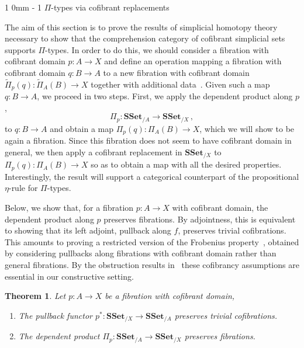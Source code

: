 \documentclass[reqno,10pt,a4paper,oneside]{amsart}
\makeatletter
\renewcommand{\section}{\@startsection
{section}%
{1}%
{0mm}%
{-\baselineskip}%
{1\baselineskip}%
{\Large \bfseries}}%
\numberwithin{equation}{section}
\theoremstyle{mythm}
\newtheorem{theorem}{Theorem}[section]
\theoremstyle{mydef}
\theoremstyle{myrmk}
\newcommand{\ie}{\text{i.e.\ }}
\newcommand{\co}{\colon}
\newcommand{\SSet}{\mathbf{SSet}}
\makeatother
\begin{document}
\section{$\Pi$-types via cofibrant replacements}
\label{sec:Pi-types}

The aim of this section is to prove the results of simplicial homotopy theory necessary to show that
the comprehension category of cofibrant simplicial sets supports $\Pi$-types. 
In order to do this, we should consider a fibration with cofibrant domain $p \co A \to X$  and define an operation mapping a fibration with cofibrant domain $q \co B \to A$  to a new fibration with cofibrant domain~$\widetilde{\Pi}_p(q) \co \widetilde{\Pi}_A(B) \to X$ together with additional data~\cite{LumsdaineP:locuoc}. 
Given such a map $q \co B \to A$, we proceed
in two steps. First, we apply the dependent product along $p$, 
\[
\Pi_p \co \SSet_{/A} \to \SSet_{/X} \, , 
\]
to $q \co B \to A$ and obtain a map $\Pi_p(q) \co \Pi_A(B) \to X$, which we will show to be again a fibration. Since this fibration does not seem to have  cofibrant domain in general, we then apply a
cofibrant replacement in $\SSet_{/X}$ to $\Pi_p(q) \co \Pi_A(B) \to X$ so as to obtain a map with all the desired properties. Interestingly, the result will support a categorical counterpart of the propositional
$\eta$-rule for $\Pi$-types.

Below, we show that, for a fibration $p \co A \rightarrow X$ with cofibrant domain, the dependent product along $p$ preserves fibrations. By adjointness, this is equivalent to showing that its left adjoint, \ie 
 pullback along $f$, preserves trivial cofibrations. This amounts to proving a restricted version of the Frobenius property~\cite{BergB:topsmi}, obtained by considering pullbacks along fibrations with
cofibrant domain rather than general fibrations. By the obstruction results in~\cite{coquand-non-constructivity-kan}  these cofibrancy assumptions are essential in our constructive setting.  


\begin{theorem}\label{cor:Pi_types_are_fibrant}
Let $p \co A \rightarrow X$ be a fibration with cofibrant domain,
\begin{enumerate}[$(i)$]
\item The pullback functor $p^* \co \SSet_{/X} \to \SSet_{/A}$ preserves trivial cofibrations.
\item The dependent product $\Pi_p \co \SSet_{/A} \to \SSet_{/X}$ preserves  fibrations.
\end{enumerate}
\end{theorem}
\end{document}
